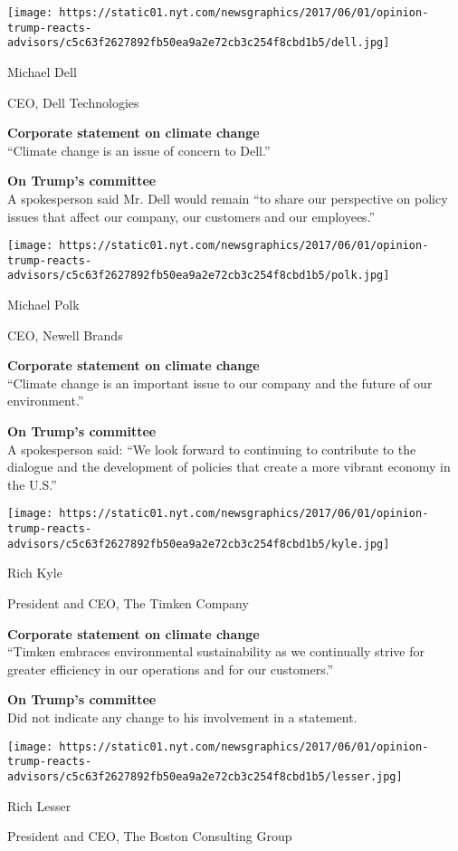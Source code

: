 \texttt{[image: https://static01.nyt.com/newsgraphics/2017/06/01/opinion-trump-reacts-advisors/c5c63f2627892fb50ea9a2e72cb3c254f8cbd1b5/dell.jpg]}

Michael Dell

CEO, Dell Technologies

\textbf{Corporate statement on climate change}\\
``Climate change is an issue of concern to Dell.''

\textbf{On Trump's committee}\\
A spokesperson said Mr. Dell would remain ``to share our perspective on
policy issues that affect our company, our customers and our
employees.''

\texttt{[image: https://static01.nyt.com/newsgraphics/2017/06/01/opinion-trump-reacts-advisors/c5c63f2627892fb50ea9a2e72cb3c254f8cbd1b5/polk.jpg]}

Michael Polk

CEO, Newell Brands

\textbf{Corporate statement on climate change}\\
``Climate change is an important issue to our company and the future of
our environment.''

\textbf{On Trump's committee}\\
A spokesperson said: ``We look forward to continuing to contribute to
the dialogue and the development of policies that create a more vibrant
economy in the U.S.''

\texttt{[image: https://static01.nyt.com/newsgraphics/2017/06/01/opinion-trump-reacts-advisors/c5c63f2627892fb50ea9a2e72cb3c254f8cbd1b5/kyle.jpg]}

Rich Kyle

President and CEO, The Timken Company

\textbf{Corporate statement on climate change}\\
``Timken embraces environmental sustainability as we continually strive
for greater efficiency in our operations and for our customers.''

\textbf{On Trump's committee}\\
Did not indicate any change to his involvement in a statement.

\texttt{[image: https://static01.nyt.com/newsgraphics/2017/06/01/opinion-trump-reacts-advisors/c5c63f2627892fb50ea9a2e72cb3c254f8cbd1b5/lesser.jpg]}

Rich Lesser

President and CEO, The Boston Consulting Group

